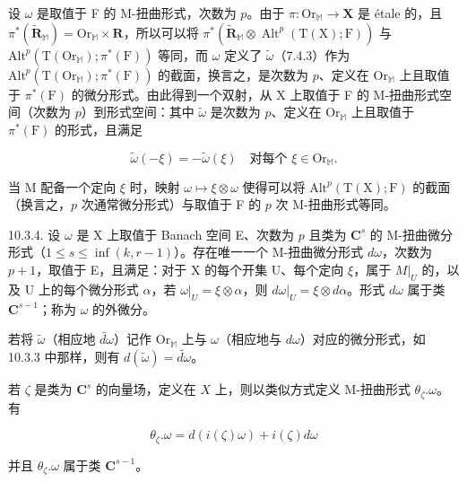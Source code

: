 设 \(\omega\) 是取值于 F 的 M-扭曲形式，次数为 \(p\)。由于 \(\pi\colon\mathrm{Or}_{\mathbb{M}}\to\mathbf{X}\) 是 étale 的，且 \(\pi^{*}(\tilde{\mathbf{R}}_{\mathbb{M}})=\mathrm{Or}_{\mathbb{M}}\times\mathbf{R}\)，所以可以将 \(\pi^{*}(\tilde{\mathbf{R}}_{\mathbb{M}}\otimes\operatorname{Alt}^{p}(\mathrm{T}(\mathrm{X});\mathrm{F}))\) 与 \(\mathrm{Alt}^{p}(\mathrm{T}(\mathrm{Or}_{\mathbb{M}});\pi^{*}(\mathrm{F}))\) 等同，而 \(\omega\) 定义了 \(\tilde{\omega}\)（7.4.3）作为 \(\mathrm{Alt}^{p}(\mathrm{T}(\mathrm{Or}_{\mathbb{M}});\pi^{*}(\mathrm{F}))\) 的截面，换言之，是次数为 \(p\)、定义在 \(\mathrm{Or}_{\mathbb{M}}\) 上且取值于 \(\pi^{*}(\mathrm{F})\) 的微分形式。由此得到一个双射，从 X 上取值于 F 的 M-扭曲形式空间（次数为 \(p\)）到形式空间：其中 \(\tilde{\omega}\) 是次数为 \(p\)、定义在 \(\mathrm{Or}_{\mathbb{M}}\) 上且取值于 \(\pi^{*}(\mathrm{F})\) 的形式，且满足

\[
\tilde{\omega}(-\xi)=-\tilde{\omega}(\xi)\quad\text{对每个 }\xi\in\mathrm{Or}_{\mathbb{M}}.
\]

当 M 配备一个定向 \(\xi\) 时，映射 \(\omega \mapsto \xi \otimes \omega\) 使得可以将 \(\mathrm{Alt}^p(\mathrm{T}(\mathrm{X});\mathrm{F})\) 的截面（换言之，\(p\) 次通常微分形式）与取值于 F 的 \(p\) 次 M-扭曲形式等同。

10.3.4. 设 \(\omega\) 是 X 上取值于 Banach 空间 E、次数为 \(p\) 且类为 \(\mathbf{C}^s\) 的 M-扭曲微分形式（\(1 \leqslant s \leqslant \inf(k, r - 1)\)）。存在唯一一个 M-扭曲微分形式 \(d\omega\)，次数为 \(p + 1\)，取值于 E，且满足：对于 X 的每个开集 U、每个定向 \(\xi\)，属于 \(M|_{U}\) 的，以及 U 上的每个微分形式 \(\alpha\)，若 \(\omega|_{U} = \xi \otimes \alpha\)，则 \(d\omega|_{U} = \xi \otimes d\alpha\)。形式 \(d\omega\) 属于类 \(\mathbf{C}^{s-1}\)；称为 \(\omega\) 的外微分。

若将 \(\tilde{\omega}\)（相应地 \(\widetilde{d\omega}\)）记作 \(\mathrm{Or}_{\mathbb{M}}\) 上与 \(\omega\)（相应地与 \(d\omega\)）对应的微分形式，如 10.3.3 中那样，则有 \(d(\tilde{\omega}) = \widetilde{d\omega}\)。

若 \(\zeta\) 是类为 \(\mathbf{C}^s\) 的向量场，定义在 \(X\) 上，则以类似方式定义 M-扭曲形式 \(\theta_{\zeta}.\omega\)。有

\[
\theta_ {\zeta}. \omega = d (i (\zeta) \omega) + i (\zeta) d \omega
\]

并且 \(\theta_{\zeta}.\omega\) 属于类 \(\mathbf{C}^{s - 1}\)。

